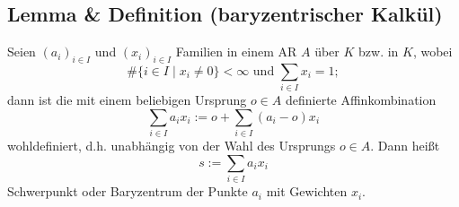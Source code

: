 \subsection{Lemma \& Definition (baryzentrischer Kalkül)}
	\begin{Definition}
		Seien $(a_i)_{i\in I}$ und $(x_i)_{i\in I}$ Familien in einem AR $ A $ über $ K $ bzw. in $ K $, wobei
		\[ \#\{i\in I\mid x_i\neq 0\}<\infty \text{ und } \sum_{i\in I}x_i=1; \]
		dann ist die mit einem beliebigen Ursprung $ o\in A $ definierte Affinkombination	
		\[ \sum_{i\in I}a_ix_i := o+\sum_{i\in I} (a_i-o)x_i \]
		wohldefiniert, d.h. unabhängig von der Wahl des Ursprungs $ o\in A $.
		Dann heißt 
		\[ s:= \sum_{i\in I} a_ix_i \]
		Schwerpunkt oder Baryzentrum der Punkte $ a_i $ mit Gewichten $ x_i $.
	\end{Definition}
